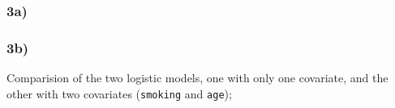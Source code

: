 \documentclass[a4paper,11pt]{article}
\begin{document}
\subsubsection{3a)}
{\footnotesize
    
}


\subsubsection{3b)}
{\footnotesize
    
}

Comparision of the two logistic models, one with only one covariate, and the other with two covariates (\texttt{smoking} and \texttt{age});
{\footnotesize
    
}



%
\end{document}
